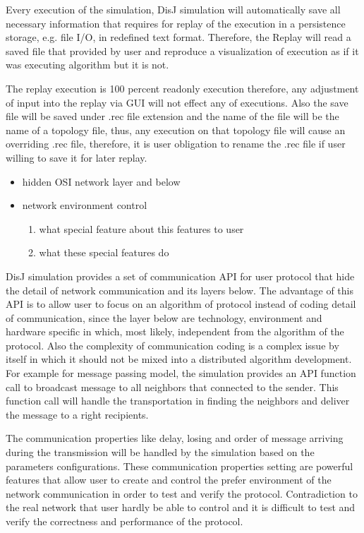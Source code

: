 Every execution of the simulation, DisJ simulation will automatically save all necessary information that requires for replay of the execution in a persistence storage, e.g. file I/O, in redefined text format. Therefore, the Replay will read a saved file that provided by user and reproduce a visualization of execution as if it was executing algorithm but it is not.

The replay execution is 100 percent readonly execution therefore, any adjustment of input into the replay via GUI will not effect any of executions. Also the save file will be saved under .rec file extension and the name of the file will be the name of a topology file, thus, any execution on that topology file will cause an overriding .rec file, therefore, it is user obligation to rename the .rec file if user willing to save it for later replay.




\begin{itemize}
\item hidden OSI network layer and below
\item network environment control
    \begin{enumerate}
    \item what special feature about this features to user
    \item what these special features do
    \end{enumerate}
\end{itemize}

 DisJ simulation provides a set of communication API for user protocol that hide the detail of network communication and its layers below. The advantage of this API is to allow user to focus on an algorithm of protocol instead of coding detail of communication, since the layer below are technology, environment and hardware specific in which, most likely, independent from the algorithm of the protocol. Also the complexity of communication coding is a complex issue by itself in which it should not be mixed into a distributed algorithm development. For example for message passing model, the simulation provides an API function call to broadcast message to all neighbors that connected to the sender. This function call will handle the transportation in finding the neighbors and deliver the message to a right recipients.

 The communication  properties like delay, losing and order of message arriving during the transmission will be handled by the simulation based on the parameters configurations. These communication properties setting are powerful features that allow user to create and control the prefer environment of the network communication in order to test and verify the protocol. Contradiction to the real network that user hardly be able to control and it is difficult to test and verify the correctness and performance of the protocol.

